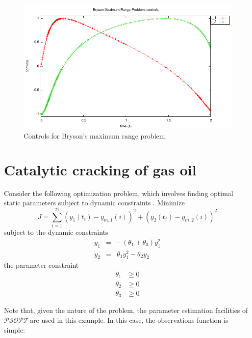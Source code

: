 \documentclass[a4paper,11pt]{report}    %
\newcommand{\psopt}{$\mathcal{PSOPT}$\,}  %
\begin{document}
\begin{figure}
  \centering
  \includegraphics{../examples/brymr/brymr_controls}
  \caption{Controls for Bryson's maximum range problem}
  \label{brymr_controls}
\end{figure}



\section{Catalytic cracking of gas oil}

Consider the following optimization problem, which involves finding optimal static
parameters subject to dynamic constraints  \cite{Dolan:01}.  Minimize 
\begin{equation}
  J = \sum\limits_{i=1}^{21} (y_1(t_i) - y_{m,1}(i) )^2 + (y_2(t_i) - y_{m,2}(i) )^2 
\end{equation}
subject to the dynamic constraints
\begin{equation}
  \begin{array}{lcl}
    \dot y_1 & = & -(\theta_1 + \theta_3)y_1^2 \\
    \dot y_2 & = & \theta_1 y_1^2 - \theta_2 y_2
  \end{array}
\end{equation}
the parameter constraint
\begin{equation}
    \begin{aligned}
       \theta_1 &\ge 0 \\
       \theta_2 &\ge 0 \\
       \theta_3 &\ge 0  
    \end{aligned}
\end{equation}

Note that, given the 
nature of the problem, the parameter estimation facilities of \psopt are 
used in this example. In this case, the observations function is simple:
\end{document}
